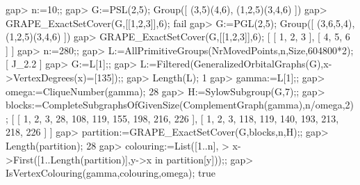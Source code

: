 \beginexample
gap> n:=10;;
gap> G:=PSL(2,5);
Group([ (3,5)(4,6), (1,2,5)(3,4,6) ])
gap> GRAPE_ExactSetCover(G,[[1,2,3]],6);
fail
gap> G:=PGL(2,5);
Group([ (3,6,5,4), (1,2,5)(3,4,6) ])
gap> GRAPE_ExactSetCover(G,[[1,2,3]],6);
[ [ 1, 2, 3 ], [ 4, 5, 6 ] ]
gap> n:=280;;
gap> L:=AllPrimitiveGroups(NrMovedPoints,n,Size,604800*2);
[ J_2.2 ]
gap> G:=L[1];;
gap> L:=Filtered(GeneralizedOrbitalGraphs(G),x->VertexDegrees(x)=[135]);;
gap> Length(L);
1
gap> gamma:=L[1];; 
gap> omega:=CliqueNumber(gamma); 
28
gap> H:=SylowSubgroup(G,7);;
gap> blocks:=CompleteSubgraphsOfGivenSize(ComplementGraph(gamma),n/omega,2);
[ [ 1, 2, 3, 28, 108, 119, 155, 198, 216, 226 ], 
  [ 1, 2, 3, 118, 119, 140, 193, 213, 218, 226 ] ]
gap> partition:=GRAPE_ExactSetCover(G,blocks,n,H);; 
gap> Length(partition);
28
gap> colouring:=List([1..n],
>    x->First([1..Length(partition)],y->x in partition[y]));;
gap> IsVertexColouring(gamma,colouring,omega);
true
\endexample

